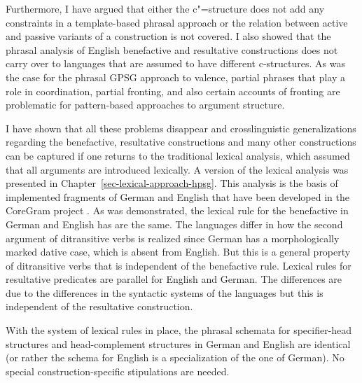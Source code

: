 Furthermore, I have argued that either the c"=structure does not add any constraints in a
template-based phrasal approach or the relation between active and passive variants of a construction
is not covered. I also showed that the phrasal analysis of English benefactive and resultative
constructions does not carry over to languages that are assumed to have different c-structures. As
was the case for the phrasal GPSG approach to valence, partial phrases that play a role in
coordination, partial fronting, and also certain accounts of fronting are problematic for
pattern-based approaches to argument structure. 

I have shown that all these problems disappear and crosslinguistic generalizations regarding the
benefactive, resultative constructions and many other constructions can be captured if one returns
to the traditional lexical analysis, which assumed that all arguments are introduced lexically. A
version of the lexical analysis was presented in Chapter~\ref{sec-lexical-approach-hpsg}. This analysis is the basis of
implemented fragments of German and English that have been developed in the CoreGram project
\citep{MuellerGrammix,MuellerCoreGram}. As was demonstrated, the lexical rule for the benefactive in
German and English has are the same. The languages differ in how the second argument of ditransitive
verbs is realized since German has a morphologically marked dative case, which is absent from
English. But this is a general property of ditransitive verbs that is independent of the benefactive
rule. Lexical rules for resultative predicates are parallel for English and German. The differences
are due to the differences in the syntactic systems of the languages but this is independent of the
resultative construction.

With the system of lexical rules in place, the phrasal schemata for specifier-head structures
and head-complement structures in German and English are identical (or rather the schema for English
is a specialization of the one of German). No special construction-specific
stipulations are needed.

